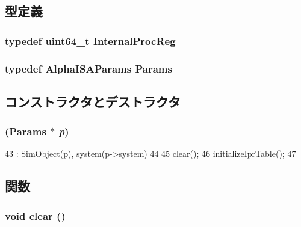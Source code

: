 \subsection{型定義}
\hypertarget{classAlphaISA_1_1ISA_a3be59bc6c39d87f5d4bd0e05abe0b416}{
\subsubsection[{InternalProcReg}]{\setlength{\rightskip}{0pt plus 5cm}typedef uint64\_\-t {\bf InternalProcReg}}}
\label{classAlphaISA_1_1ISA_a3be59bc6c39d87f5d4bd0e05abe0b416}
\hypertarget{classAlphaISA_1_1ISA_a492961bc1e489616b642e85a4e2ddf03}{
\subsubsection[{Params}]{\setlength{\rightskip}{0pt plus 5cm}typedef AlphaISAParams {\bf Params}}}
\label{classAlphaISA_1_1ISA_a492961bc1e489616b642e85a4e2ddf03}


\subsection{コンストラクタとデストラクタ}
\hypertarget{classAlphaISA_1_1ISA_ae9132e021b3f3b20c917fc328a056bbd}{
\subsubsection[{ISA}]{ ({\bf Params} $\ast$ {\em p})}}
\label{classAlphaISA_1_1ISA_ae9132e021b3f3b20c917fc328a056bbd}



\begin{DoxyCode}
43     : SimObject(p), system(p->system)
44 {
45     clear();
46     initializeIprTable();
47 }
\end{DoxyCode}


\subsection{関数}
\hypertarget{classAlphaISA_1_1ISA_ac8bb3912a3ce86b15842e79d0b421204}{
\subsubsection[{clear}]{\setlength{\rightskip}{0pt plus 5cm}void clear ()}}
\label{classAlphaISA_1_1ISA_ac8bb3912a3ce86b15842e79d0b421204}



